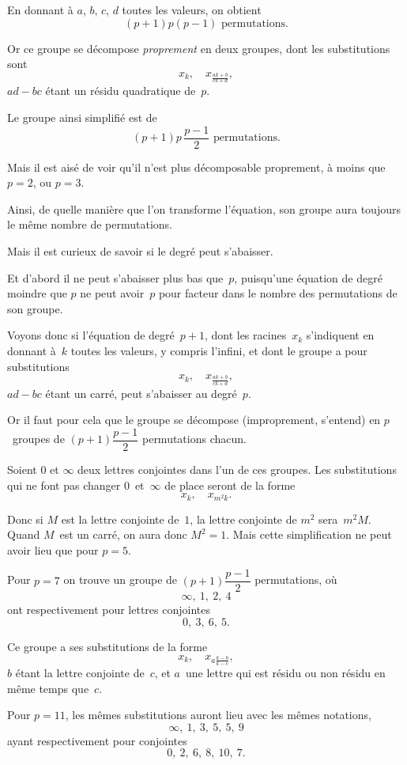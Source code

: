 \documentclass[leqno,12pt]{book}[2005/09/16]
\newcommand{\efrac}[2]{\tfrac{#1}{#2}}
\begin{document}
En donnant à $a$, $b$, $c$, $d$ toutes les valeurs, on obtient
\[
(p+1) p (p-1) \text{ permutations}.
\]

Or ce groupe se décompose \emph{proprement} en deux groupes,
dont les substitutions sont
\[
x_{k},\quad x_{\efrac{ak+b}{ck+d}} ,
\]
$ad - bc$ étant un résidu quadratique de~$p$.

Le groupe ainsi simplifié est de
\[
(p + 1) p\, \frac{p - 1}{2} \text{ permutations}.
\]

Mais il est aisé de voir qu'il n'est plus décomposable proprement,
à moins que $p = 2$, ou $p = 3$.

Ainsi, de quelle manière que l'on transforme l'équation, son
groupe aura toujours le même nombre de permutations.

Mais il est curieux de savoir si le degré peut s'abaisser.

Et d'abord il ne peut s'abaisser plus bas que~$p$, puisqu'une
équation de degré moindre que $p$ ne peut avoir~$p$ pour facteur
dans le nombre des permutations de son groupe.

Voyons donc si l'équation de degré~$p + 1$, dont les racines~$x_{k}$
s'indiquent en donnant à~$k$ toutes les valeurs, y compris l'infini,
et dont le groupe a pour substitutions
\[
x_{k},\quad x_{\efrac{ak+b}{ck+d}},
\]
$ad - bc$ étant un carré, peut s'abaisser au degré~$p$.

Or il faut pour cela que le groupe se décompose (improprement,
s'entend) en $p$~groupes de $(p + 1)\dfrac{p - 1}{2}$ permutations
chacun.

Soient $0$ et $\infty$ deux lettres conjointes dans l'un de ces groupes.
Les substitutions qui ne font pas changer $0$~et~$\infty$ de place seront
de la forme
\[
x_{k},\quad x_{m^{2} k}.
\]

Donc si $M$ est la lettre conjointe de~$1$, la lettre conjointe de $m^{2}$
sera~$m^{2} M$. Quand $M$~est un carré, on aura donc $M^{2} = 1$. Mais
cette simplification ne peut avoir lieu que pour $p = 5$.

Pour $p = 7$ on trouve un groupe de $(p + 1)\dfrac{p - 1}{2}$ permutations,
où
\[
\infty,\ 1,\ 2,\ 4
\]
ont respectivement pour lettres conjointes
\[
0,\ 3,\ 6,\ 5.
\]

Ce groupe a ses substitutions de la forme
\[
x_{k}, \quad x_{a\efrac{k - b}{k - c}},
\]
$b$ étant la lettre conjointe de~$c$, et $a$~une lettre qui est résidu ou
non résidu en même temps que~$c$.

Pour $p = 11$, les mêmes substitutions auront lieu avec les
mêmes notations,
\[
\infty,\ 1,\ 3,\ 5,\ 5,\ 9
\]
ayant respectivement pour conjointes
\[
0,\ 2,\ 6,\ 8,\ 10,\ 7.
\]
\end{document}
